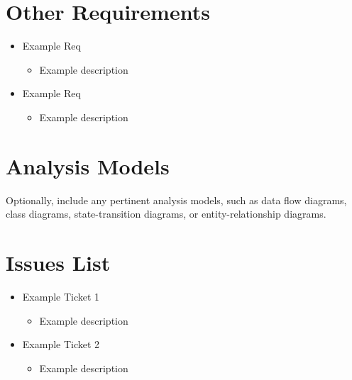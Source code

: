 \documentclass[12pt,oneside,letterpaper]{article}
\begin{document}
\section{Other Requirements}
\begin{itemize}
    \item Example Req
    \begin{itemize}
        \item Example description
    \end{itemize}
    \item Example Req
    \begin{itemize}
        \item Example description
    \end{itemize}
\end{itemize}

\appendix

\section{Analysis Models}
Optionally, include any pertinent analysis models, such as data flow diagrams, class diagrams, state-transition diagrams, or entity-relationship diagrams.

\section{Issues List}
\begin{itemize}
    \item Example Ticket 1
    \begin{itemize}
        \item Example description
    \end{itemize}
    \item Example Ticket 2
    \begin{itemize}
        \item Example description
    \end{itemize}
\end{itemize}

\printnoidxglossary[sort=standard]
\end{document}
